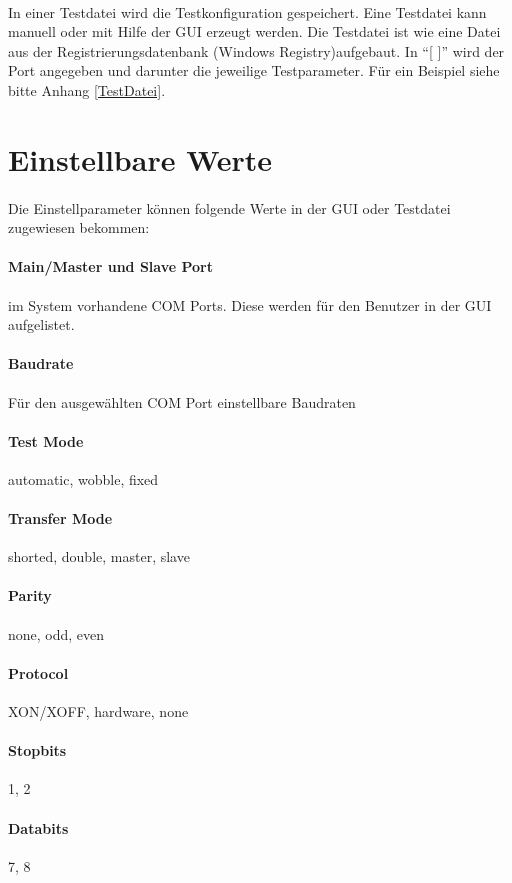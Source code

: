 \paragraph{}
In einer Testdatei wird die Testkonfiguration gespeichert. Eine Testdatei kann manuell oder mit Hilfe der GUI erzeugt werden. Die Testdatei ist wie eine Datei aus der Registrierungsdatenbank (Windows Registry)aufgebaut. In "`[ ]"' wird der Port angegeben und darunter die jeweilige Testparameter. Für ein Beispiel siehe bitte Anhang \ref{TestDatei}.


\section{Einstellbare Werte}
\paragraph{}
Die Einstellparameter können folgende Werte in der GUI oder Testdatei zugewiesen bekommen:
\paragraph{Main/Master und Slave Port} im System vorhandene COM Ports. Diese werden für den Benutzer in der GUI aufgelistet.
\paragraph{Baudrate} Für den ausgewählten COM Port einstellbare Baudraten
\paragraph{Test Mode} automatic, wobble, fixed
\paragraph{Transfer Mode} shorted, double, master, slave
\paragraph{Parity} none, odd, even
\paragraph{Protocol} XON/XOFF, hardware, none
\paragraph{Stopbits} 1, 2
\paragraph{Databits} 7, 8
